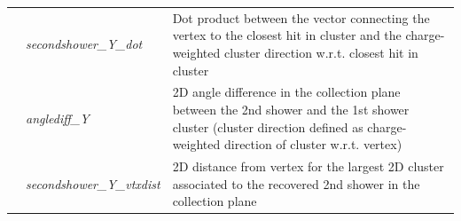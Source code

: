 \begin{table}[ht]
\begin{tabular}{ m{} | m{} | m{}  }
\parbox[t]{2mm}{}  & \emph{secondshower\_Y\_dot} &  Dot product between the vector connecting the vertex to the closest hit in cluster and the charge-weighted cluster direction w.r.t. closest hit in cluster \\  
 & \emph{anglediff\_Y} & 2D angle difference in the collection plane between the 2nd shower and the 1st shower cluster  (cluster direction defined as charge-weighted direction of cluster w.r.t. vertex) \\ 
 & \emph{secondshower\_Y\_vtxdist} & 2D distance from vertex for the largest 2D cluster associated to the  recovered 2nd shower in the collection plane \\
\hline
\end{tabular}
\label{tab:variableSummary}
\end{table}
